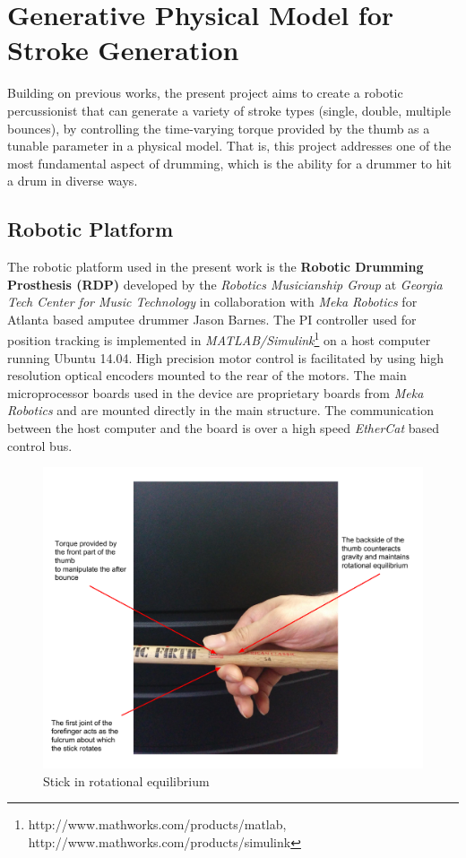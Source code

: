 \documentclass[final,1p,times]{elsarticle}
\begin{document}
\section{Generative Physical Model for Stroke Generation}
Building on previous works, the present project aims to create a robotic
percussionist that can generate a variety of stroke types (single, double, multiple bounces), by controlling the time-varying torque provided by the thumb as a tunable parameter in a physical model. That is, this project addresses one of the most fundamental aspect of drumming, which is the ability for a drummer to hit a drum in diverse ways.
\subsection{Robotic Platform}

The robotic platform used in the present work is the \textbf{Robotic Drumming Prosthesis (RDP)} developed by the \textit{Robotics Musicianship Group} at \textit{Georgia Tech Center for Music Technology} in collaboration with \textit{Meka Robotics} for Atlanta based amputee drummer Jason Barnes. The PI controller used for position tracking is implemented in \textit{MATLAB/Simulink}\footnote{http://www.mathworks.com/products/matlab, http://www.mathworks.com/products/simulink} on a host computer running Ubuntu 14.04. High precision motor control is facilitated by using high resolution optical encoders mounted to the rear of the motors. The main microprocessor boards used in the device are proprietary boards from \textit{Meka Robotics} and are mounted directly in the main structure. The communication between the host computer and the board is over a high speed \textit{EtherCat} based control bus. 
\begin{figure}[h]
	\begin{center}
		\includegraphics[width = 1\hsize]{./figures/Fig1.pdf}
		\caption{Stick in rotational equilibrium}
		\label{HS}
	\end{center}
\end{figure}
\end{document}
